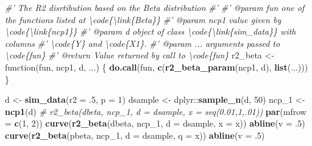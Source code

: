 \documentclass[]{article}
\newenvironment{Shaded}{\begin{snugshade}}{\end{snugshade}}
\newcommand{\KeywordTok}[1]{\textcolor[rgb]{0.13,0.29,0.53}{\textbf{{#1}}}}
\newcommand{\DataTypeTok}[1]{\textcolor[rgb]{0.13,0.29,0.53}{{#1}}}
\newcommand{\DecValTok}[1]{\textcolor[rgb]{0.00,0.00,0.81}{{#1}}}
\newcommand{\StringTok}[1]{\textcolor[rgb]{0.31,0.60,0.02}{{#1}}}
\newcommand{\CommentTok}[1]{\textcolor[rgb]{0.56,0.35,0.01}{\textit{{#1}}}}
\newcommand{\NormalTok}[1]{{#1}}
\begin{document}
\begin{Shaded}
\begin{Highlighting}[]
\CommentTok{#' The R2 disrtibution based on the Beta distribution}
\CommentTok{#'}
\CommentTok{#' @param fun one of the functions listed at \textbackslash{}code\{\textbackslash{}link\{Beta\}\}}
\CommentTok{#' @param ncp1 value given by \textbackslash{}code\{\textbackslash{}link\{ncp1\}\}}
\CommentTok{#' @param d object of class \textbackslash{}code\{\textbackslash{}link\{sim_data\}\} with columns }
\CommentTok{#' \textbackslash{}code\{Y\} and \textbackslash{}code\{X1\}.}
\CommentTok{#' @param ... arguments passed to \textbackslash{}code\{fun\} }
\CommentTok{#' @return Value returned by call to \textbackslash{}code\{fun\}}
\NormalTok{r2_beta <-}\StringTok{ }\NormalTok{function(fun, ncp1, d, ...) \{}
  \KeywordTok{do.call}\NormalTok{(fun, }\KeywordTok{c}\NormalTok{(}\KeywordTok{r2_beta_param}\NormalTok{(ncp1, d), }\KeywordTok{list}\NormalTok{(...)))}
\NormalTok{\}}


\NormalTok{d <-}\StringTok{ }\KeywordTok{sim_data}\NormalTok{(}\DataTypeTok{r2 =} \NormalTok{.}\DecValTok{5}\NormalTok{, }\DataTypeTok{p =} \DecValTok{1}\NormalTok{)}
\NormalTok{dsample <-}\StringTok{ }\NormalTok{dplyr::}\KeywordTok{sample_n}\NormalTok{(d, }\DecValTok{50}\NormalTok{)}
\NormalTok{ncp_1 <-}\StringTok{ }\KeywordTok{ncp1}\NormalTok{(d)}
\CommentTok{# r2_beta(dbeta, ncp_1, d = dsample, x = seq(0.01,1,.01))}
\KeywordTok{par}\NormalTok{(}\DataTypeTok{mfrow =} \KeywordTok{c}\NormalTok{(}\DecValTok{1}\NormalTok{, }\DecValTok{2}\NormalTok{))}
\KeywordTok{curve}\NormalTok{(}\KeywordTok{r2_beta}\NormalTok{(dbeta, ncp_1, }\DataTypeTok{d =} \NormalTok{dsample, }\DataTypeTok{x =} \NormalTok{x))}
\KeywordTok{abline}\NormalTok{(}\DataTypeTok{v =} \NormalTok{.}\DecValTok{5}\NormalTok{)}
\KeywordTok{curve}\NormalTok{(}\KeywordTok{r2_beta}\NormalTok{(pbeta, ncp_1, }\DataTypeTok{d =} \NormalTok{dsample, }\DataTypeTok{q =} \NormalTok{x))}
\KeywordTok{abline}\NormalTok{(}\DataTypeTok{v =} \NormalTok{.}\DecValTok{5}\NormalTok{)}
\end{Highlighting}
\end{Shaded}
\end{document}
